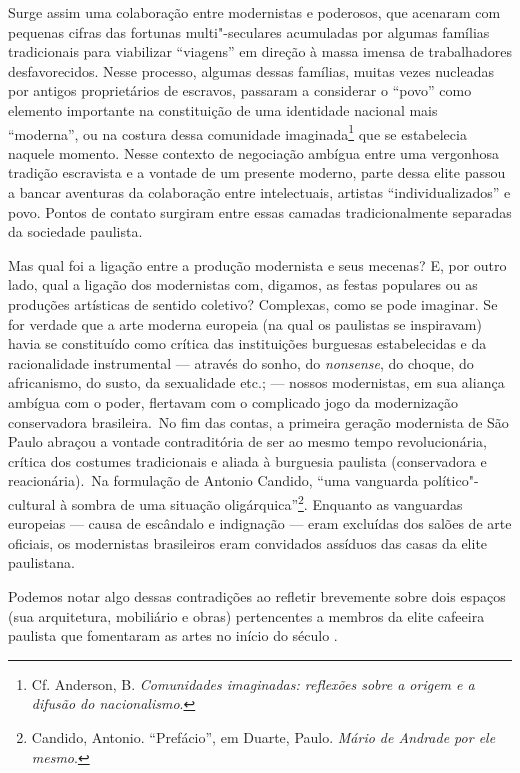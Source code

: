 Surge assim uma colaboração entre modernistas e poderosos, que acenaram com
pequenas cifras das fortunas multi"-seculares acumuladas por algumas
famílias tradicionais para viabilizar ``viagens'' em direção à massa
imensa de trabalhadores desfavorecidos. Nesse processo, algumas dessas
famílias, muitas vezes nucleadas por antigos proprietários de escravos,
passaram a considerar o ``povo'' como elemento importante na
constituição de uma identidade nacional mais ``moderna'', ou na costura
dessa comunidade imaginada\footnote{Cf. Anderson, B. \emph{Comunidades
  imaginadas: reflexões sobre a origem e a difusão do nacionalismo}.}
que se estabelecia naquele momento. Nesse contexto de negociação ambígua
entre uma vergonhosa tradição escravista e a vontade de um presente
moderno, parte dessa elite passou a bancar aventuras da colaboração
entre intelectuais, artistas ``individualizados'' e povo. Pontos de contato surgiram entre
essas camadas tradicionalmente separadas da sociedade paulista.

Mas qual foi a ligação entre a produção modernista e seus mecenas? E,
por outro lado, qual a ligação dos modernistas com, digamos, as festas
populares ou as produções artísticas de sentido coletivo? Complexas,
como se pode imaginar. Se for verdade que a arte moderna europeia (na
qual os paulistas se inspiravam) havia se constituído como crítica das
instituições burguesas estabelecidas e da racionalidade instrumental ---
através do sonho, do \emph{nonsense}, do choque, do africanismo, do
susto, da sexualidade etc.; --- nossos modernistas, em sua aliança
ambígua com o poder, flertavam com o complicado jogo da modernização
conservadora brasileira.~No fim das contas, a primeira geração
modernista de São Paulo abraçou a vontade contraditória de ser ao mesmo
tempo revolucionária, crítica dos costumes tradicionais e aliada à
burguesia paulista (conservadora e reacionária).~Na formulação de
Antonio Candido, ``uma vanguarda político"-cultural à sombra de uma
situação oligárquica''\footnote{Candido, Antonio. ``Prefácio'', em
  Duarte, Paulo. \emph{Mário de Andrade por ele mesmo}.}. Enquanto as 
vanguardas europeias --- causa de escândalo e indignação --- eram excluídas dos
salões de arte oficiais, os modernistas brasileiros eram convidados assíduos
das casas da elite paulistana.

Podemos notar algo dessas contradições ao refletir brevemente sobre dois
espaços (sua arquitetura, mobiliário e obras) pertencentes a membros da
elite cafeeira paulista que fomentaram as artes no início do século .

